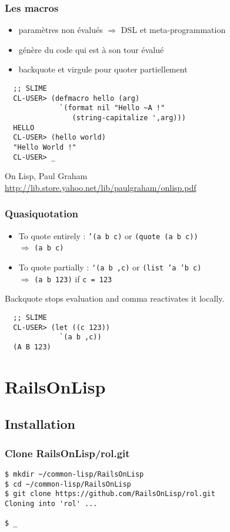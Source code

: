 \documentclass[8pt]{beamer}
\begin{document}
\begin{frame}[fragile]
  \frametitle{Les macros}
  \begin{itemize}
    \item paramètres non évalués $\Rightarrow$ DSL et meta-programmation
    \item génère du code qui est à son tour évalué
    \item backquote et virgule pour quoter partiellement
  \end{itemize}
\begin{verbatim}
  ;; SLIME
  CL-USER> (defmacro hello (arg)
             `(format nil "Hello ~A !"
                (string-capitalize ',arg)))
  HELLO
  CL-USER> (hello world)
  "Hello World !"
  CL-USER> _
\end{verbatim}
  \vspace{1em}
  On Lisp, Paul Graham \\
  \url{http://lib.store.yahoo.net/lib/paulgraham/onlisp.pdf}
\end{frame}

\begin{frame}[fragile]
  \frametitle{Quasiquotation}
  \begin{itemize}
  \item To quote entirely : {\tt '(a b c)} or {\tt (quote (a b c))} \\
    $\Rightarrow$ {\tt (a b c)}
  \item To quote partially : {\tt `(a b ,c)} or {\tt (list 'a 'b c)} \\
    $\Rightarrow$ {\tt (a b 123)} if {\tt c = 123}
  \end{itemize}
  Backquote stops evaluation and comma reactivates it locally.
\begin{verbatim}
  ;; SLIME
  CL-USER> (let ((c 123))
             `(a b ,c))
  (A B 123)
\end{verbatim}
\end{frame}

\section{RailsOnLisp}
\subsection{Installation}

\begin{frame}[fragile]
  \frametitle{Clone RailsOnLisp/rol.git}
\begin{verbatim}
$ mkdir ~/common-lisp/RailsOnLisp
$ cd ~/common-lisp/RailsOnLisp
$ git clone https://github.com/RailsOnLisp/rol.git
Cloning into 'rol' ...

$ _
\end{verbatim}
\end{frame}
\end{document}
